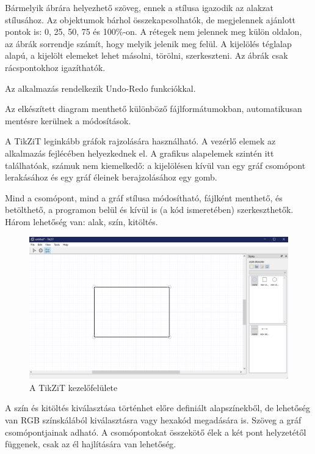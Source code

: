 Bármelyik ábrára helyezhető szöveg, ennek a stílusa igazodik az alakzat stílusához. Az objektumok bárhol összekapcsolhatók, de megjelennek ajánlott pontok is: 0, 25, 50, 75 és 100\%-on. A rétegek nem jelennek meg külön oldalon, az ábrák sorrendje számít, hogy melyik jelenik meg felül. A kijelölés téglalap alapú, a kijelölt elemeket lehet másolni, törölni, szerkeszteni. Az ábrák csak rácspontokhoz igazíthatók.

Az alkalmazás rendelkezik Undo-Redo funkciókkal. 

Az elkészített diagram menthető különböző fájlformátumokban, automatikusan mentésre kerülnek a módosítások. 



A TikZiT leginkább gráfok rajzolására használható. A vezérlő elemek az alkalmazás fejlécében helyezkednek el. A grafikus alapelemek szintén itt találhatóak, számuk nem kiemelkedő: a kijelölésen kívül van egy gráf csomópont lerakásához és egy gráf éleinek berajzolásához egy gomb. 

Mind a csomópont, mind a gráf stílusa módosítható, fájlként menthető, és betölthető, a programon belül és kívül is (a kód ismeretében) szerkeszthetők. Három lehetőség van: alak, szín, kitöltés. 

\begin{figure}[!h]
	\includegraphics[width=\textwidth]{images/tikzit.png}
	\caption{A TikZiT kezelőfelülete \cite{tikzit}}
	\label{fig:tikzit}
\end{figure}

A szín és kitöltés kiválasztása történhet előre definiált alapszínekből, de lehetőség van RGB színskálából kiválasztásra vagy hexakód megadására is. Szöveg a gráf csomópontjainak adható. A csomópontokat összekötő élek a két pont helyzetétől függenek, csak az él hajlítására van lehetőség. 

